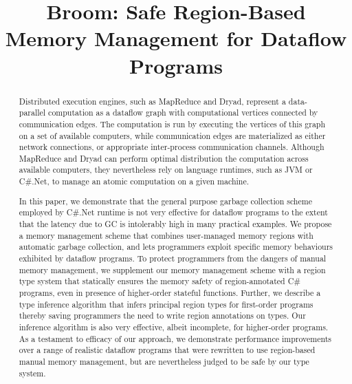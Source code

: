 \documentclass[pldi]{sigplanconf}
\begin{document}




\title{Broom: Safe Region-Based Memory Management for Dataflow
Programs}

\authorinfo{}
           {}
           {}
\maketitle

\begin{abstract}

Distributed execution engines, such as MapReduce and Dryad, represent
a data-parallel computation as a dataflow graph with computational
vertices connected by communication edges. The computation is run by
executing the vertices of this graph on a set of available computers,
while communication edges are materialized as either network
connections, or appropriate inter-process communication channels.
Although MapReduce and Dryad can perform optimal distribution the
computation across available computers, they nevertheless rely on
language runtimes, such as JVM or C\#.Net, to manage an atomic
computation on a given machine. 

In this paper, we demonstrate that the general purpose garbage
collection scheme employed by C\#.Net runtime is not very effective
for dataflow programs to the extent that the latency due to GC is
intolerably high in many practical examples. We propose a memory
management scheme that combines user-managed memory regions with
automatic garbage collection, and lets programmers exploit specific
memory behaviours exhibited by dataflow programs. To protect
programmers from the dangers of manual memory management, we
supplement our memory management scheme with a region type system that
statically ensures the memory safety of region-annotated C\# programs,
even in presence of higher-order stateful functions. Further, we
describe a type inference algorithm that infers principal region types
for first-order programs thereby saving programmers the need to write
region annotations on types. Our inference algorithm is also very
effective, albeit incomplete, for higher-order programs. As a
testament to efficacy of our approach, we demonstrate performance
improvements over a range of realistic dataflow programs that were
rewritten to use region-based manual memory management, but are
nevertheless judged to be safe by our type system.

\end{abstract}
\end{document}
